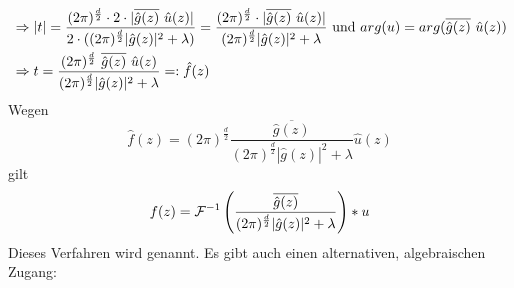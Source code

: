\begin{enumerate}[label = \arabic*. Ansatz:]
\begin{align*}
                        &\Rightarrow |t| = \frac{(2\pi)^\frac{d}{2} \C 2 \C |\overline{\hat g(z)} \ \hat u(z)|}{2\C((2\pi)^\frac{d}{2}|\hat g(z)|^2 + \lambda)} = \frac{(2\pi)^\frac{d}{2}\C |\overline{\hat g(z)} \ \hat u(z)|}{(2\pi)^\frac{d}{2}|\hat g(z)|^2 + \lambda} \text{ und } arg(u)=arg(\overline{\hat g(z)} \ \hat u(z))\\
                        &\Rightarrow t =  \frac{(2\pi)^\frac{d}{2} \ \overline{\hat g(z)} \ \hat u(z)}{(2\pi)^\frac{d}{2}|\hat g(z)|^2 + \lambda}=:\hat f(z)
                    \end{align*}
                    Wegen
                    \[\hat f(z) = (2\pi)^\frac{d}{2} \frac{\overline{\hat g(z)}}{(2\pi)^\frac{d}{2}|\hat g(z)|^2 + \lambda} \hat u(z)\]
                    gilt
                    \begin{equation}
                        f(z) = \mathcal F^{-1}\left( \frac{\overline{\hat g(z)}}{(2\pi)^\frac{d}{2}|\hat g(z)|^2 + \lambda} \right) * u
                    \end{equation}
                    Dieses Verfahren wird  genannt.
                    Es gibt auch einen alternativen, algebraischen Zugang:


\end{enumerate}
